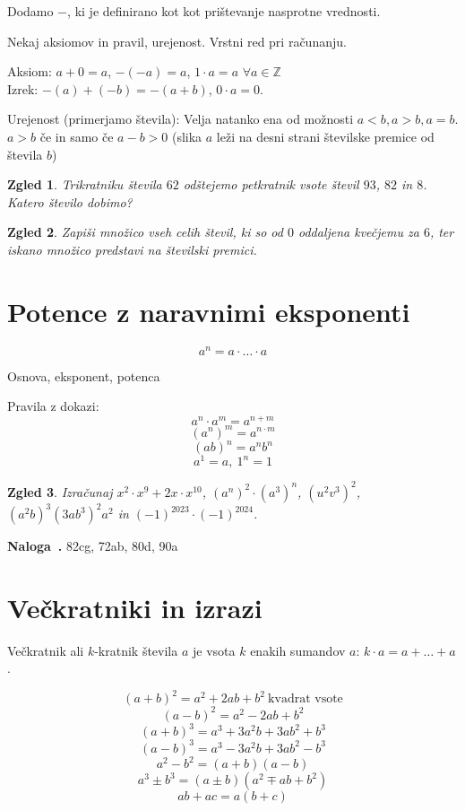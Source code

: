 \documentclass{article}
\newcounter{example}[section]
\newenvironment{example}[1][]{\refstepcounter{example}\par\medskip
   \noindent \textbf{Naloga~\theexample. #1} \rmfamily}{\medskip}
\newtheorem*{zgled}{Zgled}
\begin{document}
Dodamo $-$, ki je definirano kot kot prištevanje nasprotne vrednosti.

Nekaj aksiomov in pravil, urejenost. Vrstni red pri računanju.

Aksiom: $a+0=a$, $-(-a)=a$, $1\cdot a =a$ $\forall a\in\mathbb{Z}$\\
Izrek: $-(a)+(-b)=-(a+b)$, $0\cdot a =0$.

Urejenost (primerjamo števila): Velja natanko ena od možnosti $a<b,a>b,a=b$. $a>b$ če in samo če $a-b>0$ (slika $a$ leži na desni strani številske premice od števila $b$)

\begin{zgled}
    Trikratniku števila $62$ odštejemo petkratnik vsote števil $93$, $82$ in $8$. Katero število dobimo?
\end{zgled}

\begin{zgled}
    Zapiši množico vseh celih števil, ki so od $0$ oddaljena kvečjemu za $6$, ter iskano množico predstavi na številski premici.
\end{zgled}

\section{Potence z naravnimi eksponenti}

\[a^n=a\cdot\ldots\cdot a\]

Osnova, eksponent, potenca

Pravila z dokazi:
\[a^n\cdot a^m =a^{n+m}\]
\[\left(a^n\right)^m=a^{n\cdot m}\]
\[\left(ab\right)^n=a^n b^n\]
\[a^1=a, \ 1^n = 1\]

\begin{zgled}
    Izračunaj $x^2 \cdot x^9 +2x\cdot x^{10}$, $\left(a^n\right)^2\cdot\left(a^3 \right)^n$, $\left(u^2v^3\right)^2$, $\left(a^2b\right)^3\left(3ab^3\right)^2a^2$ in $(-1)^{2023}\cdot (-1)^{2024}$.
\end{zgled}

\begin{example}
    82cg, 72ab, 80d, 90a
\end{example}

\section{Večkratniki in izrazi}

Večkratnik ali $k$-kratnik števila $a$ je vsota $k$ enakih sumandov $a$: $k\cdot a = a+\ldots +a$.

\[(a+b)^2=a^2+2ab+b^2 \ \text{kvadrat vsote}\]
\[(a-b)^2=a^2-2ab+b^2\]
\[(a+b)^3=a^3+3a^2b+3ab^2+b^3\]
\[(a-b)^3=a^3-3a^2b+3ab^2-b^3\]
\[a^2-b^2=(a+b)(a-b)\]
\[a^3\pm b^3=(a\pm b)(a^2\mp ab+b^2)\]
\[ab+ac =a(b+c)\]
\end{document}
